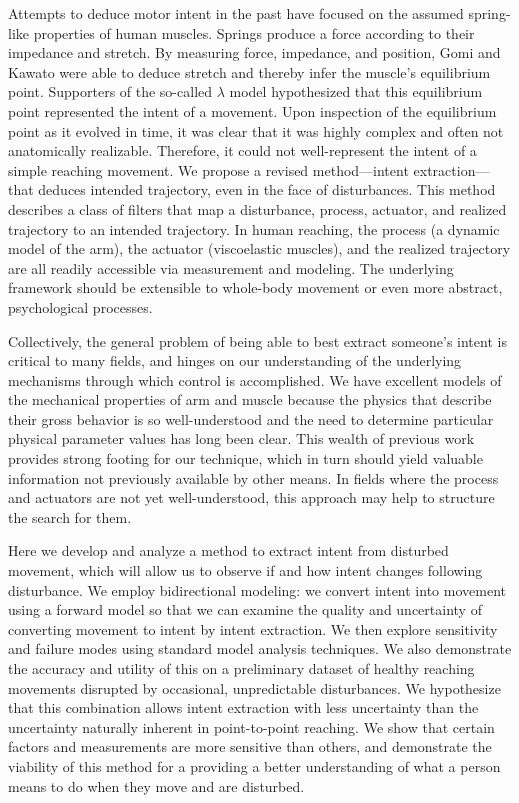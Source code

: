 \documentclass[10pt]{article}
\begin{document}
Attempts to deduce motor intent in the past have focused on the assumed spring-like properties of human muscles. Springs produce a force according to their impedance and stretch. By measuring force, impedance, and position, Gomi and Kawato\cite{gomi1997human} were able to deduce stretch and thereby infer the muscle's equilibrium point. Supporters of the so-called $\lambda$ model\cite{feldman1995origin} hypothesized that this equilibrium point represented the intent of a movement. Upon inspection of the equilibrium point as it evolved in time, it was clear that it was highly complex and often not anatomically realizable. Therefore, it could not well-represent the intent of a simple reaching movement. We propose a revised method---intent extraction---that deduces intended trajectory, even in the face of disturbances. This method describes a class of filters that map a disturbance, process, actuator, and realized trajectory to an intended trajectory. In human reaching, the process (a dynamic model of the arm), the actuator (viscoelastic muscles), and the realized trajectory are all readily accessible via measurement and modeling. The underlying framework should be extensible to whole-body movement or even more abstract, psychological processes.

Collectively, the general problem of being able to best extract someone's intent is critical to many fields, and hinges on our understanding of the underlying mechanisms through which control is accomplished. We have excellent models of the mechanical properties of arm and muscle because the physics that describe their gross behavior is so well-understood and the need to determine particular physical parameter values has long been clear. This wealth of previous work provides strong footing for our technique, which in turn should yield valuable information not previously available by other means. In fields where the process and actuators are not yet well-understood, this approach may help to structure the search for them.

Here we develop and analyze a method to extract intent from disturbed movement, which will allow us to observe if and how intent changes following disturbance. We employ bidirectional modeling: we convert intent into movement using a forward model so that we can examine the quality and uncertainty of converting movement to intent by intent extraction. We then explore sensitivity and failure modes using standard model analysis techniques. We also demonstrate the accuracy and utility of this on a preliminary dataset of healthy reaching movements disrupted by occasional, unpredictable disturbances. We hypothesize that this combination allows intent extraction with less uncertainty than the uncertainty naturally inherent in point-to-point reaching. We show that certain factors and measurements are more sensitive than others, and demonstrate the viability of this method for a providing a better understanding of what a person means to do when they move and are disturbed.
\end{document}
